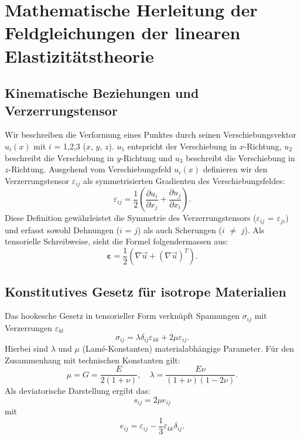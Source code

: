 %
%
%
%
\section{Mathematische Herleitung der Feldgleichungen der linearen Elastizitätstheorie}
\label{elastomechanik:section:herleitung2}

\subsection{Kinematische Beziehungen und Verzerrungstensor}
Wir beschreiben die Verformung eines Punktes durch seinen Verschiebungsvektor $u_i(x)$ mit $i$ = 1,2,3 ($x$, $y$, $z$).
$u_1$ entspricht der Verschiebung in $x$-Richtung, $u_2$ beschreibt die Verschiebung in $y$-Richtung und $u_3$ beschreibt die Verschiebung in $z$-Richtung.
Ausgehend vom Verschiebungsfeld $u_i(x)$ definieren wir den Verzerrungstensor $\varepsilon_{ij}$ als symmetrisierten Gradienten des Verschiebungsfeldes:
\begin{equation}
	\varepsilon_{ij} = 
	\frac{1}{2} \left( \frac{\partial u_i}{\partial x_j} + \frac{\partial u_j}{\partial x_i} \right).
\end{equation}
Diese Definition gewährleistet die Symmetrie des Verzerrungstensors ($\varepsilon_{ij}$ = $\varepsilon_{ji}$) und erfasst sowohl Dehnungen ($i$ = $j$) als auch Scherungen ($i$ $\neq$ $j$).
Als tensorielle Schreibweise, sieht die Formel folgendermassen aus:
\begin{equation}
	\boldsymbol{\varepsilon} = 
	\frac{1}{2} \left( \nabla \vec{u} + (\nabla \vec{u})^T \right).
\end{equation}

\subsection{Konstitutives Gesetz für isotrope Materialien}
Das hookesche Gesetz in tensorieller Form verknüpft Spannungen $\sigma_{ij}$ mit Verzerrungen $\varepsilon_{kl}$
\begin{equation}
	\sigma_{ij} = 
	\lambda \delta_{ij} \varepsilon_{kk} + 2\mu \varepsilon_{ij}.
\end{equation}
Hierbei sind $\lambda$ und $\mu$ (Lamé-Konstanten) materialabhängige Parameter. Für den Zusammenhang mit technischen Konstanten gilt:
\begin{equation}
	\mu = 
	G = 
	\frac{E}{2(1+\nu)}, \quad \lambda = 
	\frac{E \nu}{(1+\nu)(1-2\nu)}.
\end{equation}	
Als deviatorische Darstellung ergibt das:
\begin{equation}
	s_{ij} =
	2\mu e_{ij}
\end{equation}
mit
\begin{equation}
	e_{ij} = 
	\varepsilon_{ij} - \frac{1}{3} \varepsilon_{kk} \delta_{ij}.
\end{equation}

